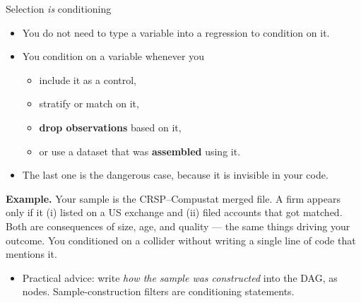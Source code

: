 \documentclass[
  11pt,
  ignorenonframetext,
  aspectratio=169,
]{beamer}
\providecommand{\tightlist}{%
  \setlength{\itemsep}{0pt}\setlength{\parskip}{0pt}}
\begin{document}
\begin{frame}{Selection \emph{is} conditioning}
\protect{}\label{selection-is-conditioning}
\begin{itemize}
\tightlist
\item
  You do not need to type a variable into a regression to condition on
  it.
\item
  You condition on a variable whenever you

  \begin{itemize}
  \tightlist
  \item
    include it as a control,
  \item
    stratify or match on it,
  \item
    \textbf{drop observations} based on it,
  \item
    or use a dataset that was \textbf{assembled} using it.
  \end{itemize}
\item
  The last one is the dangerous case, because it is invisible in your
  code.
\end{itemize}

\vspace{0.3em}

\textbf{Example.} Your sample is the CRSP--Compustat merged file. A firm
appears only if it (i) listed on a US exchange and (ii) filed accounts
that got matched. Both are consequences of size, age, and quality ---
the same things driving your outcome. You conditioned on a collider
without writing a single line of code that mentions it.

\vspace{0.3em}

\begin{itemize}
\tightlist
\item
  Practical advice: write \emph{how the sample was constructed} into the
  DAG, as nodes. Sample-construction filters are conditioning
  statements.
\end{itemize}
\end{frame}
\end{document}
